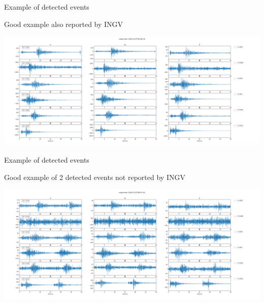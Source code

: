 \documentclass[aspectratio=43,9pt]{beamer}
\begin{document}
\begin{frame}{Example of detected events}
 
   \begin{minipage}{1\linewidth}
    \centering Good example also reported by INGV
    \vskip 0.4cm 
    \begin{center}
     \includegraphics[width=1\linewidth]{figs/good_detected_2019-11-07T02-40-19-1p2.png}     
    \end{center}
  \end{minipage}
   
\end{frame}


\begin{frame}{Example of detected events}
 
   \begin{minipage}{1\linewidth}
    \centering Good example of 2 detected events not reported by INGV
    \vskip 0.4cm 
    \begin{center}
     \includegraphics[width=1\linewidth]{figs/good_2019-11-07T00-27-45-1p2.png}     
    \end{center}
  \end{minipage}
   
\end{frame}
\end{document}

